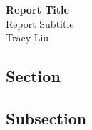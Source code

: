 \documentclass[12pt, a4paper]{article}
\title{
    \textbf{Report Title} \\
    \large Report Subtitle \\
    \small Tracy Liu
    \author Tracy Liu
    \date{}
}
\begin{document}
    \begin{CJK*}{UTF8}{bsmi}

    \begin{center}
        \LARGE\textbf{Report Title} \\
        \large Report Subtitle \\
        \small Tracy Liu \\
    \end{center}

    \begin{multicols*}{2}

    \section{Section}
        \subsection{Subsection}

    \end{multicols*}
    \end{CJK*}
\end{document}
